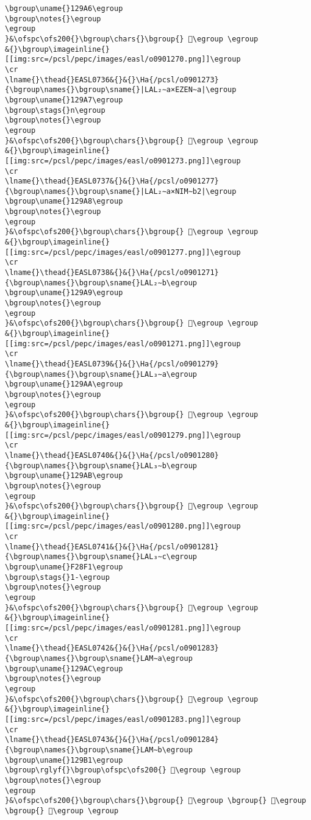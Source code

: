 \begin{verbatim}
\bgroup\uname{}129A6\egroup
\bgroup\notes{}\egroup
\egroup
}&\ofspc\ofs200{}\bgroup\chars{}\bgroup{} 𒦦\egroup \egroup
&{}\bgroup\imageinline{}[[img:src=/pcsl/pepc/images/easl/o0901270.png]]\egroup
\cr
\lname{}\thead{}EASL0736&{}&{}\Ha{/pcsl/o0901273}{\bgroup\names{}\bgroup\sname{}|LAL₂∼a×EZEN∼a|\egroup
\bgroup\uname{}129A7\egroup
\bgroup\stags{}n\egroup
\bgroup\notes{}\egroup
\egroup
}&\ofspc\ofs200{}\bgroup\chars{}\bgroup{} 𒦧\egroup \egroup
&{}\bgroup\imageinline{}[[img:src=/pcsl/pepc/images/easl/o0901273.png]]\egroup
\cr
\lname{}\thead{}EASL0737&{}&{}\Ha{/pcsl/o0901277}{\bgroup\names{}\bgroup\sname{}|LAL₂∼a×NIM∼b2|\egroup
\bgroup\uname{}129A8\egroup
\bgroup\notes{}\egroup
\egroup
}&\ofspc\ofs200{}\bgroup\chars{}\bgroup{} 𒦨\egroup \egroup
&{}\bgroup\imageinline{}[[img:src=/pcsl/pepc/images/easl/o0901277.png]]\egroup
\cr
\lname{}\thead{}EASL0738&{}&{}\Ha{/pcsl/o0901271}{\bgroup\names{}\bgroup\sname{}LAL₂∼b\egroup
\bgroup\uname{}129A9\egroup
\bgroup\notes{}\egroup
\egroup
}&\ofspc\ofs200{}\bgroup\chars{}\bgroup{} 𒦩\egroup \egroup
&{}\bgroup\imageinline{}[[img:src=/pcsl/pepc/images/easl/o0901271.png]]\egroup
\cr
\lname{}\thead{}EASL0739&{}&{}\Ha{/pcsl/o0901279}{\bgroup\names{}\bgroup\sname{}LAL₃∼a\egroup
\bgroup\uname{}129AA\egroup
\bgroup\notes{}\egroup
\egroup
}&\ofspc\ofs200{}\bgroup\chars{}\bgroup{} 𒦪\egroup \egroup
&{}\bgroup\imageinline{}[[img:src=/pcsl/pepc/images/easl/o0901279.png]]\egroup
\cr
\lname{}\thead{}EASL0740&{}&{}\Ha{/pcsl/o0901280}{\bgroup\names{}\bgroup\sname{}LAL₃∼b\egroup
\bgroup\uname{}129AB\egroup
\bgroup\notes{}\egroup
\egroup
}&\ofspc\ofs200{}\bgroup\chars{}\bgroup{} 𒦫\egroup \egroup
&{}\bgroup\imageinline{}[[img:src=/pcsl/pepc/images/easl/o0901280.png]]\egroup
\cr
\lname{}\thead{}EASL0741&{}&{}\Ha{/pcsl/o0901281}{\bgroup\names{}\bgroup\sname{}LAL₃∼c\egroup
\bgroup\uname{}F28F1\egroup
\bgroup\stags{}1-\egroup
\bgroup\notes{}\egroup
\egroup
}&\ofspc\ofs200{}\bgroup\chars{}\bgroup{} 󲣱\egroup \egroup
&{}\bgroup\imageinline{}[[img:src=/pcsl/pepc/images/easl/o0901281.png]]\egroup
\cr
\lname{}\thead{}EASL0742&{}&{}\Ha{/pcsl/o0901283}{\bgroup\names{}\bgroup\sname{}LAM∼a\egroup
\bgroup\uname{}129AC\egroup
\bgroup\notes{}\egroup
\egroup
}&\ofspc\ofs200{}\bgroup\chars{}\bgroup{} 𒦬\egroup \egroup
&{}\bgroup\imageinline{}[[img:src=/pcsl/pepc/images/easl/o0901283.png]]\egroup
\cr
\lname{}\thead{}EASL0743&{}&{}\Ha{/pcsl/o0901284}{\bgroup\names{}\bgroup\sname{}LAM∼b\egroup
\bgroup\uname{}129B1\egroup
\bgroup\rglyf{}\bgroup\ofspc\ofs200{} 𒦱\egroup \egroup
\bgroup\notes{}\egroup
\egroup
}&\ofspc\ofs200{}\bgroup\chars{}\bgroup{} 𒦭\egroup \bgroup{} 𒦱\egroup \bgroup{} 𒦲\egroup \egroup

\end{verbatim}
